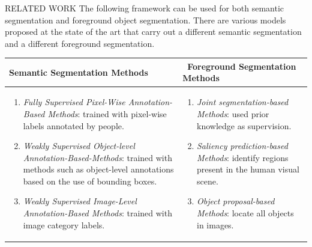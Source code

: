 \begin{frame}{RELATED WORK}
    The following framework can be used for both semantic segmentation 
    and foreground object segmentation. There are various models proposed 
    at the state of the art that carry out a different semantic segmentation 
    and a different foreground segmentation.
    \begin{table}[h!]
        \begin{adjustbox}{max width=\textwidth}
        \begin{tabular}{|p{6cm}|p{6cm}|}
            \hline
            \centering
            \bfseries{Semantic Segmentation Methods} &  ~\bfseries{Foreground Segmentation Methods} \\
            \hline
            \begin{enumerate}
                \item \emph{Fully Supervised Pixel-Wise Annotation-Based Methods}: trained with 
                pixel-wise labels annotated by people.
                \item \emph{Weakly Supervised Object-level Annotation-Based-Methods}: trained with 
                methods such as object-level annotations based on the use of bounding 
                boxes.
                \item \emph{Weakly Supervised Image-Level Annotation-Based Methods}: trained 
                with image category labels.
            \end{enumerate}
            & 
            \begin{enumerate}
                \item \emph{Joint segmentation-based Methods}: used prior knowledge as supervision.
                \item \emph{Saliency prediction-based Methods}: identify regions present in the human 
                visual scene.
                \item \emph{Object proposal-based Methods}: locate all objects in images.
            \end{enumerate}\\
            \hline
        \end{tabular}
        \end{adjustbox}
    \end{table}
\end{frame}

